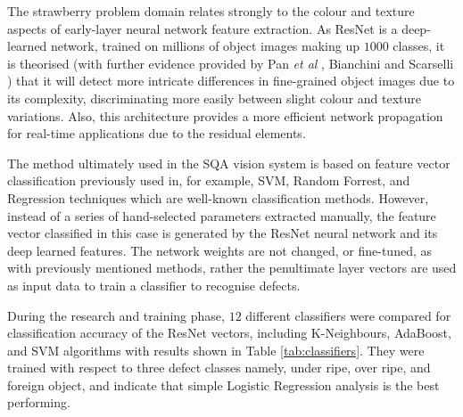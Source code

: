 \documentclass[fleqn,twoside,12pt]{report}
\begin{document}
The strawberry problem domain relates strongly to the colour and texture aspects of early-layer neural network feature extraction. As ResNet is a deep-learned network, trained on millions of object images making up $1000$ classes, it is theorised (with further evidence provided by Pan {\it et al} \cite{pan}, Bianchini and Scarselli \cite{bianchini}) that it will detect more intricate differences in fine-grained object images due to its complexity, discriminating more easily between slight colour and texture variations. Also, this architecture provides a more efficient network propagation for real-time applications due to the residual elements.

The method ultimately used in the SQA vision system is based on feature vector classification previously used in, for example, SVM, Random Forrest, and Regression techniques which are well-known classification methods. However, instead of a series of hand-selected parameters extracted manually, the feature vector classified in this case is generated by the ResNet neural network and its deep learned features. The network weights are not changed, or fine-tuned, as with previously mentioned methods, rather the penultimate layer vectors are used as input data to train a classifier to recognise defects. 


During the research and training phase, $12$ different classifiers were compared for classification accuracy of the ResNet vectors, including K-Neighbours, AdaBoost, and SVM algorithms with results shown in Table \ref{tab:classifiers}. They were trained with respect to three defect classes namely, under ripe, over ripe, and foreign object, and indicate that simple Logistic Regression analysis is the best performing. 
\end{document}
